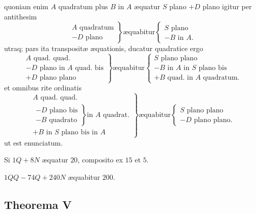 \documentclass[11pt,a4paper]{article}
\begin{document}
quoniam enim $A$ quadratum plus $B$ in $A$ æquatur $S$ plano $+ D$ plano igitur per antithesim
\[ \left.\begin{array}{l} A \text{ quadratum} \\ - D \text{ plano} \end{array}\right\} \text{æquabitur} \left\{\begin{array}{l} S \text{ plano} \\ - B \text{ in } A. \end{array}\right. \]
utraq; pars ita transpositæ æquationis, ducatur quadratice ergo
\[ \left.\begin{array}{l} A \text{ quad. quad.} \\ - D \text{ plano in } A \text{ quad. bis} \\ + D \text{ plano plano} \end{array}\right\} \text{æquabitur} \left\{\begin{array}{l} S \text{ plano plano} \\ - B \text{ in } A \text{ in } S \text{ plano bis} \\ + B \text{ quad. in } A \text{ quadratum.} \end{array}\right. \]
et omnibus rite ordinatis
\[ \left.\begin{array}{l} A \text{ quad. quad.} \\ \left.\begin{array}{l} - D \text{ plano bis} \\ - B \text{ quadrato} \end{array}\right\} \text{in } A \text{ quadrat.} \\ + B \text{ in } S \text{ plano bis in } A \end{array}\right\} \text{æquabitur} \left\{\begin{array}{l} S \text{ plano plano} \\ - D \text{ plano plano.} \end{array}\right. \]
ut est enunciatum.

Si $1Q + 8N$ æquatur $20$, composito ex $15$ et $5$.

$1QQ - 74Q + 240N$ æquabitur $200$.


\subsection*{Theorema V}
\end{document}
